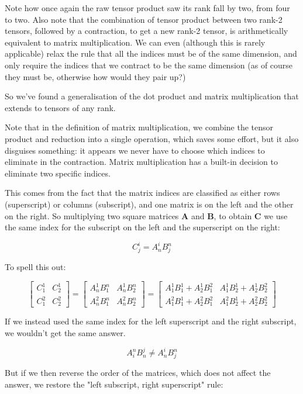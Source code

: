 Note how once again the raw tensor product saw its rank fall by two, from four to two. Also note that the combination of tensor product between two rank-2 tensors, followed by a contraction, to get a new rank-2 tensor, is arithmetically equivalent to matrix multiplication. We can even (although this is rarely applicable) relax the rule that all the indices must be of the same dimension, and only require the indices that we contract to be the same dimension (as of course they must be, otherwise how would they pair up?)

So we've found a generalisation of the dot product and matrix multiplication that extends to tensors of any rank.

Note that in the definition of matrix multiplication, we combine the tensor product and reduction into a single operation, which saves some effort, but it also disguises something: it appears we never have to choose which indices to eliminate in the contraction. Matrix multiplication has a built-in decision to eliminate two specific indices.

This comes from the fact that the matrix indices are classified as either rows (superscript) or columns (subscript), and one matrix is on the left and the other on the right. So multiplying two square matrices $\boldsymbol{A}$ and $\boldsymbol{B}$, to obtain $\boldsymbol{C}$ we use the same index for the subscript on the left and the superscript on the right:

$$C^i_j = A^i_nB^n_j$$

To spell this out:

$$
\begin{bmatrix}C^1_1 & C^1_2 \\ C^2_1 & C^2_2\end{bmatrix}
= \begin{bmatrix}A^1_nB^n_1 & A^1_nB^n_2 \\ A^2_nB^n_1 & A^2_nB^n_2\end{bmatrix}
= \begin{bmatrix}A^1_1B^1_1 + A^1_2B^2_1 & A^1_1B^1_2 + A^1_2B^2_2 \\ A^2_1B^1_1 + A^2_2B^2_1 & A^2_1B^1_2 + A^2_2B^2_2\end{bmatrix}
$$

If we instead used the same index for the left superscript and the right subscript, we wouldn't get the same answer.

$$A^n_iB^j_n \ne A^i_nB^n_j$$

But if we then reverse the order of the matrices, which does not affect the answer, we restore the "left subscript, right superscript" rule:

